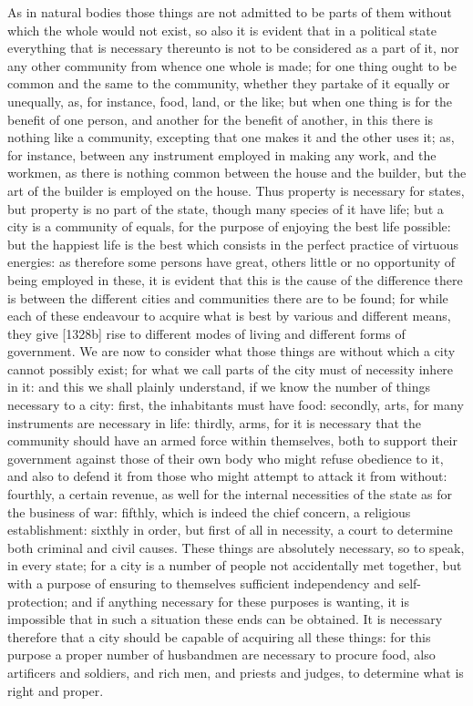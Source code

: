 
As in natural bodies those things are not admitted to be parts of them
without which the whole would not exist, so also it is evident that in a
political state everything that is necessary thereunto is not to be
considered as a part of it, nor any other community from whence one whole
is made; for one thing ought to be common and the same to the community,
whether they partake of it equally or unequally, as, for instance, food,
land, or the like; but when one thing is for the benefit of one person,
and another for the benefit of another, in this there is nothing like a
community, excepting that one makes it and the other uses it; as, for
instance, between any instrument employed in making any work, and the
workmen, as there is nothing common between the house and the builder, but
the art of the builder is employed on the house. Thus property is
necessary for states, but property is no part of the state, though many
species of it have life; but a city is a community of equals, for the
purpose of enjoying the best life possible: but the happiest life is the
best which consists in the perfect practice of virtuous energies: as
therefore some persons have great, others little or no opportunity of
being employed in these, it is evident that this is the cause of the
difference there is between the different cities and communities there are
to be found; for while each of these endeavour to acquire what is best by
various and different means, they give [1328b] rise to different modes of
living and different forms of government. We are now to consider what
those things are without which a city cannot possibly exist; for what we
call parts of the city must of necessity inhere in it: and this we shall
plainly understand, if we know the number of things necessary to a city:
first, the inhabitants must have food: secondly, arts, for many
instruments are necessary in life: thirdly, arms, for it is necessary that
the community should have an armed force within themselves, both to
support their government against those of their own body who might refuse
obedience to it, and also to defend it from those who might attempt to
attack it from without: fourthly, a certain revenue, as well for the
internal necessities of the state as for the business of war: fifthly,
which is indeed the chief concern, a religious establishment: sixthly in
order, but first of all in necessity, a court to determine both criminal
and civil causes. These things are absolutely necessary, so to speak, in
every state; for a city is a number of people not accidentally met
together, but with a purpose of ensuring to themselves sufficient
independency and self-protection; and if anything necessary for these
purposes is wanting, it is impossible that in such a situation these ends
can be obtained. It is necessary therefore that a city should be capable
of acquiring all these things: for this purpose a proper number of
husbandmen are necessary to procure food, also artificers and soldiers,
and rich men, and priests and judges, to determine what is right and
proper.

